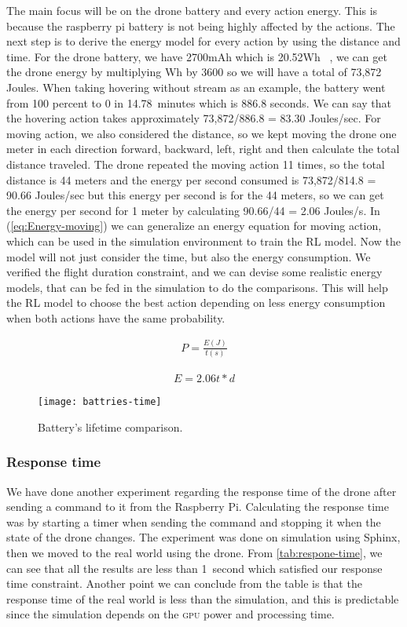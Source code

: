 \documentclass[../main.tex]{subfiles}
\begin{document}
The main focus will be on the drone battery and every 
action energy. This is because the raspberry pi battery 
is not being highly affected by the actions. 
The next step is to derive the energy model for every 
action by using the distance and time. For the drone battery, 
we have 2700mAh which is 20.52Wh ~\cite{Par19}, 
we can get the drone energy by multiplying Wh by 3600 
so we will have a total of 73,872 Joules. When taking
hovering without stream as an example, the battery 
went from 100 percent to 0 in \SI{14.78}{minutes} which is 
886.8 seconds. We can say that the hovering action takes 
approximately 73,872/886.8 = 83.30 Joules/sec. 
For moving action,
we also considered the distance, so we kept 
moving the drone one meter in each direction 
{forward, backward, left, right} and then calculate 
the total distance traveled. The drone repeated 
the moving action 11 times, so the total distance 
is 44 meters and the energy per second consumed 
is 73,872/814.8 = 90.66 Joules/sec but this energy 
per second is for the 44 meters, so we can get the 
energy per second for 1 meter by calculating 
90.66/44 = 2.06 Joules/s. 
In (\ref{eq:Energy-moving}) we can generalize an energy 
equation for moving action, which can be used in the simulation 
environment to train the RL model. Now the model will not 
just consider the time, but also the energy consumption.
We verified the flight duration constraint, and we can devise some 
realistic energy models, that can be fed in the simulation 
to do the comparisons. This will help the RL model to choose 
the best action depending on less energy consumption 
when both actions have the same probability. 

\begin{align}
	P = \frac{E(J)}{t(s)} 
	\label{eq:power}
\end{align}

\begin{align}
	E = 2.06t*d
	\label{eq:Energy-moving}
\end{align}

\begin{figure}[!t]
	\centering
	\texttt{[image: battries-time]}
	\caption{Battery's lifetime comparison.}
	\label{fig:time-comparison}
\end{figure}

\subsubsection{Response time}

We have done another experiment regarding the response time 
of the drone after sending a command to it from the Raspberry Pi. 
Calculating the response time was by starting a timer when 
sending the command and stopping it when the 
state of the drone changes. 
The experiment was done on simulation using Sphinx,
then we moved to the real world using the \anafi drone.
From \cref{tab:respone-time}, 
we can see that all the results are less than \SI{1}{second}
which satisfied our response time constraint.
Another point we can conclude from the table is that 
the response time of the real world is less than 
the simulation, and this is predictable since the simulation
depends on the \textsc{gpu} power and processing time. 
\end{document}
